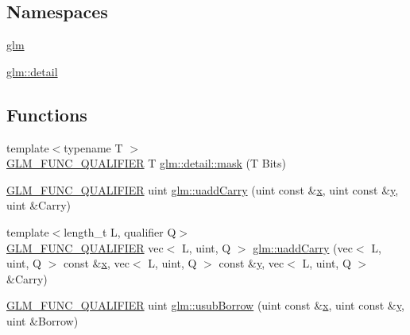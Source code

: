 \subsection*{Namespaces}
\begin{DoxyCompactItemize}
\item 
 \mbox{\hyperlink{namespaceglm}{glm}}
\item 
 \mbox{\hyperlink{namespaceglm_1_1detail}{glm\+::detail}}
\end{DoxyCompactItemize}
\subsection*{Functions}
\begin{DoxyCompactItemize}
\item 
{\footnotesize template$<$typename T $>$ }\\\mbox{\hyperlink{setup_8hpp_a33fdea6f91c5f834105f7415e2a64407}{G\+L\+M\+\_\+\+F\+U\+N\+C\+\_\+\+Q\+U\+A\+L\+I\+F\+I\+ER}} T \mbox{\hyperlink{namespaceglm_1_1detail_a048ad00e8777f9f3ebe185ed48857df0}{glm\+::detail\+::mask}} (T Bits)
\item 
\mbox{\hyperlink{setup_8hpp_a33fdea6f91c5f834105f7415e2a64407}{G\+L\+M\+\_\+\+F\+U\+N\+C\+\_\+\+Q\+U\+A\+L\+I\+F\+I\+ER}} uint \mbox{\hyperlink{namespaceglm_a541d30d3289d3a3da69edec69df11a04}{glm\+::uadd\+Carry}} (uint const \&\mbox{\hyperlink{_s_d_l__opengl_8h_ad0e63d0edcdbd3d79554076bf309fd47}{x}}, uint const \&\mbox{\hyperlink{_s_d_l__opengl_8h_a1675d9d7bb68e1657ff028643b4037e3}{y}}, uint \&Carry)
\item 
{\footnotesize template$<$length\+\_\+t L, qualifier Q$>$ }\\\mbox{\hyperlink{setup_8hpp_a33fdea6f91c5f834105f7415e2a64407}{G\+L\+M\+\_\+\+F\+U\+N\+C\+\_\+\+Q\+U\+A\+L\+I\+F\+I\+ER}} vec$<$ L, uint, Q $>$ \mbox{\hyperlink{group__core__func__integer_gaedcec48743632dff6786bcc492074b1b}{glm\+::uadd\+Carry}} (vec$<$ L, uint, Q $>$ const \&\mbox{\hyperlink{_s_d_l__opengl_8h_ad0e63d0edcdbd3d79554076bf309fd47}{x}}, vec$<$ L, uint, Q $>$ const \&\mbox{\hyperlink{_s_d_l__opengl_8h_a1675d9d7bb68e1657ff028643b4037e3}{y}}, vec$<$ L, uint, Q $>$ \&Carry)
\item 
\mbox{\hyperlink{setup_8hpp_a33fdea6f91c5f834105f7415e2a64407}{G\+L\+M\+\_\+\+F\+U\+N\+C\+\_\+\+Q\+U\+A\+L\+I\+F\+I\+ER}} uint \mbox{\hyperlink{namespaceglm_ac7a75ea277a43b855920597adeebb2e3}{glm\+::usub\+Borrow}} (uint const \&\mbox{\hyperlink{_s_d_l__opengl_8h_ad0e63d0edcdbd3d79554076bf309fd47}{x}}, uint const \&\mbox{\hyperlink{_s_d_l__opengl_8h_a1675d9d7bb68e1657ff028643b4037e3}{y}}, uint \&Borrow)

\end{DoxyCompactItemize}
